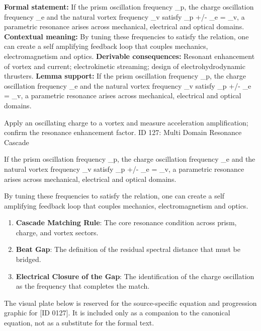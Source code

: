 \begingroup\footnotesize\setlength{\emergencystretch}{3em}\sloppy
\textbf{Formal statement:} If the prism oscillation frequency  \_p, the charge oscillation frequency  \_e and the natural vortex frequency  \_v satisfy  \_p +/-  \_e =  \_v, a parametric resonance arises across mechanical, electrical and optical domains.
\textbf{Contextual meaning:} By tuning these frequencies to satisfy the relation, one can create a self amplifying feedback loop that couples mechanics, electromagnetism and optics.
\textbf{Derivable consequences:} Resonant enhancement of vortex and current; electrokinetic streaming; design of electrohydrodynamic thrusters.
\textbf{Lemma support:} If the prism oscillation frequency  \_p, the charge oscillation frequency  \_e and the natural vortex frequency  \_v satisfy  \_p +/-  \_e =  \_v, a parametric resonance arises across mechanical, electrical and optical domains.\par
\endgroup

Apply an oscillating charge to a vortex and measure acceleration amplification; confirm the resonance enhancement factor. ID 127: Multi Domain Resonance Cascade

If the prism oscillation frequency  \_p, the charge oscillation frequency  \_e and the natural vortex frequency  \_v satisfy  \_p +/-  \_e =  \_v, a parametric resonance arises across mechanical, electrical and optical domains.

By tuning these frequencies to satisfy the relation, one can create a self amplifying feedback loop that couples mechanics, electromagnetism and optics.
\endgroup

\begin{enumerate}[leftmargin=1.6em,itemsep=6pt,topsep=4pt]
\item \textbf{Cascade Matching Rule}: The core resonance condition across prism, charge, and vortex sectors.
\item \textbf{Beat Gap}: The definition of the residual spectral distance that must be bridged.
\item \textbf{Electrical Closure of the Gap}: The identification of the charge oscillation as the frequency that completes the match.
\end{enumerate}

\begingroup\footnotesize\sloppy
The visual plate below is reserved for the source-specific equation and progression graphic for [ID 0127]. It is included only as a companion to the canonical equation, not as a substitute for the formal text.
\par\endgroup
\ifTZPDarkEdition
{}
\fi


